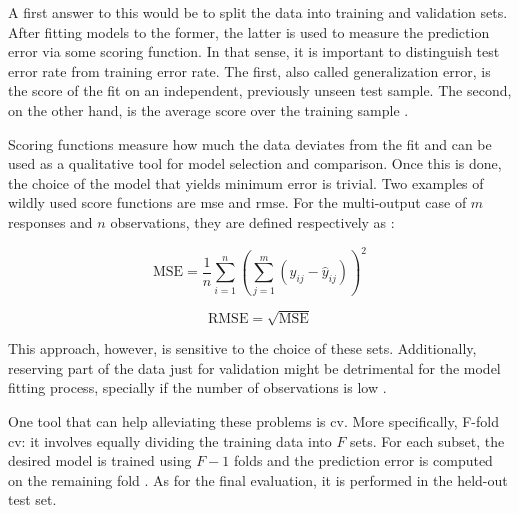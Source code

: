 A first answer to this would be to split the data into training and validation sets. After fitting models to the former, the latter is used to measure the prediction error via some scoring function. In that sense, it is important to distinguish test error rate from training error rate. The first, also called generalization error, is the score of the fit on an independent, previously unseen test sample. The second, on the other hand, is the average score over the training sample \parencite{friedman2001}.

Scoring functions measure how much the data deviates from the fit and can be used as a qualitative tool for model selection and comparison.  Once this is done, the choice of the model that yields minimum error is trivial. Two examples of wildly used score functions are \acrfull{mse} and \acrfull{rmse}. For the multi-output case of $m$ responses and $n$ observations, they are defined respectively as :

\begin{equation} 
	\label{eqn:mse}
	\text{MSE} = \frac{1}{n}  \sum_{i=1}^{n} \left(\sum_{j=1}^{m}(y_{ij} - \hat{y}_{ij})\right)^2
\end{equation}

\begin{equation} 
	\label{eqn:rmse}
	\text{RMSE} = \sqrt{\text{MSE}}
\end{equation}
 
This approach, however,  is sensitive to the choice of these sets. Additionally, reserving part of the data just for validation might be detrimental for the model fitting process, specially if the number of observations is low \parencite{james2013introduction}.

One tool that can help alleviating these problems is \acrfull{cv}. More specifically,  F-fold \acrshort{cv}: it involves equally dividing the training data into $F$ sets. For each subset, the desired model is trained using $F-1$ folds and the prediction error is computed on the remaining fold \parencite{friedman2001}. As for the final evaluation, it is performed in the held-out test set.